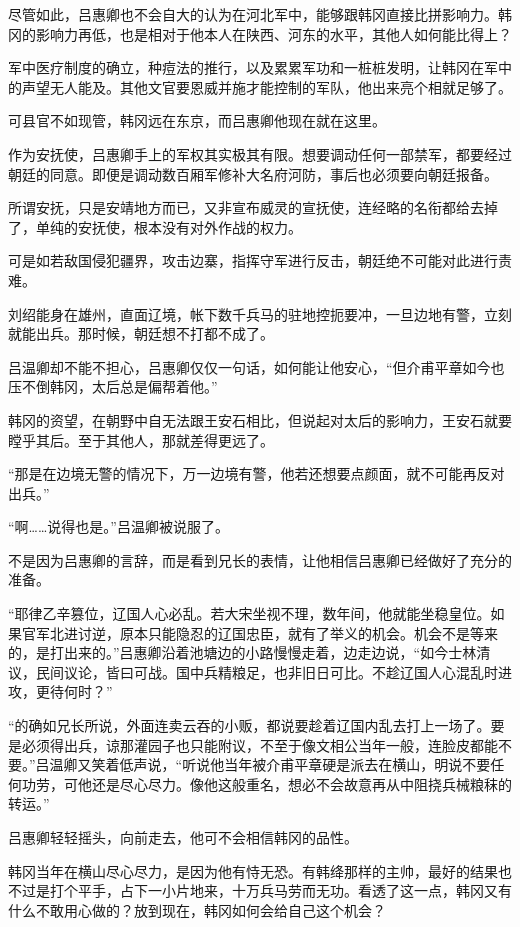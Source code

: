 尽管如此，吕惠卿也不会自大的认为在河北军中，能够跟韩冈直接比拼影响力。韩冈的影响力再低，也是相对于他本人在陕西、河东的水平，其他人如何能比得上？

军中医疗制度的确立，种痘法的推行，以及累累军功和一桩桩发明，让韩冈在军中的声望无人能及。其他文官要恩威并施才能控制的军队，他出来亮个相就足够了。

可县官不如现管，韩冈远在东京，而吕惠卿他现在就在这里。

作为安抚使，吕惠卿手上的军权其实极其有限。想要调动任何一部禁军，都要经过朝廷的同意。即便是调动数百厢军修补大名府河防，事后也必须要向朝廷报备。

所谓安抚，只是安靖地方而已，又非宣布威灵的宣抚使，连经略的名衔都给去掉了，单纯的安抚使，根本没有对外作战的权力。

可是如若敌国侵犯疆界，攻击边寨，指挥守军进行反击，朝廷绝不可能对此进行责难。

刘绍能身在雄州，直面辽境，帐下数千兵马的驻地控扼要冲，一旦边地有警，立刻就能出兵。那时候，朝廷想不打都不成了。

吕温卿却不能不担心，吕惠卿仅仅一句话，如何能让他安心，“但介甫平章如今也压不倒韩冈，太后总是偏帮着他。”

韩冈的资望，在朝野中自无法跟王安石相比，但说起对太后的影响力，王安石就要瞠乎其后。至于其他人，那就差得更远了。

“那是在边境无警的情况下，万一边境有警，他若还想要点颜面，就不可能再反对出兵。”

“啊……说得也是。”吕温卿被说服了。

不是因为吕惠卿的言辞，而是看到兄长的表情，让他相信吕惠卿已经做好了充分的准备。

“耶律乙辛篡位，辽国人心必乱。若大宋坐视不理，数年间，他就能坐稳皇位。如果官军北进讨逆，原本只能隐忍的辽国忠臣，就有了举义的机会。机会不是等来的，是打出来的。”吕惠卿沿着池塘边的小路慢慢走着，边走边说，“如今士林清议，民间议论，皆曰可战。国中兵精粮足，也非旧日可比。不趁辽国人心混乱时进攻，更待何时？”

“的确如兄长所说，外面连卖云吞的小贩，都说要趁着辽国内乱去打上一场了。要是必须得出兵，谅那灌园子也只能附议，不至于像文相公当年一般，连脸皮都能不要。”吕温卿又笑着低声说，“听说他当年被介甫平章硬是派去在横山，明说不要任何功劳，可他还是尽心尽力。像他这般重名，想必不会故意再从中阻挠兵械粮秣的转运。”

吕惠卿轻轻摇头，向前走去，他可不会相信韩冈的品性。

韩冈当年在横山尽心尽力，是因为他有恃无恐。有韩绛那样的主帅，最好的结果也不过是打个平手，占下一小片地来，十万兵马劳而无功。看透了这一点，韩冈又有什么不敢用心做的？放到现在，韩冈如何会给自己这个机会？

